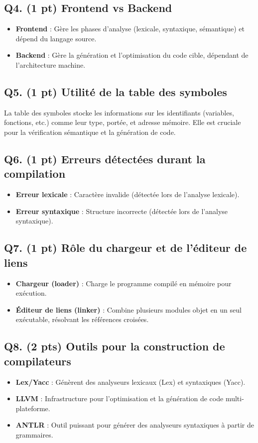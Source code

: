 \documentclass[12pt]{article}
\begin{document}
\subsection*{Q4. (1 pt) Frontend vs Backend}
\begin{itemize}
    \item \textbf{Frontend} : Gère les phases d'analyse (lexicale, syntaxique, sémantique) et dépend du langage source.
    \item \textbf{Backend} : Gère la génération et l'optimisation du code cible, dépendant de l'architecture machine.
\end{itemize}

\subsection*{Q5. (1 pt) Utilité de la table des symboles}
La table des symboles stocke les informations sur les identifiants (variables, fonctions, etc.) comme leur type, portée, et adresse mémoire. Elle est cruciale pour la vérification sémantique et la génération de code.

\subsection*{Q6. (1 pt) Erreurs détectées durant la compilation}
\begin{itemize}
    \item \textbf{Erreur lexicale} : Caractère invalide (détectée lors de l'analyse lexicale).
    \item \textbf{Erreur syntaxique} : Structure incorrecte (détectée lors de l'analyse syntaxique).
\end{itemize}

\subsection*{Q7. (1 pt) Rôle du chargeur et de l'éditeur de liens}
\begin{itemize}
    \item \textbf{Chargeur (loader)} : Charge le programme compilé en mémoire pour exécution.
    \item \textbf{Éditeur de liens (linker)} : Combine plusieurs modules objet en un seul exécutable, résolvant les références croisées.
\end{itemize}

\subsection*{Q8. (2 pts) Outils pour la construction de compilateurs}
\begin{itemize}
    \item \textbf{Lex/Yacc} : Génèrent des analyseurs lexicaux (Lex) et syntaxiques (Yacc).
    \item \textbf{LLVM} : Infrastructure pour l'optimisation et la génération de code multi-plateforme.
    \item \textbf{ANTLR} : Outil puissant pour générer des analyseurs syntaxiques à partir de grammaires.
\end{itemize}
\end{document}
